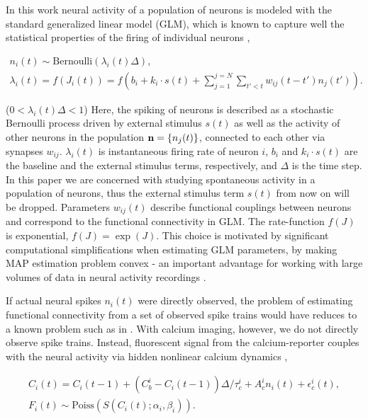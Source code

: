 In this work neural activity of a population of neurons is modeled with the standard generalized linear model (GLM), which is known to capture well the statistical properties of the firing of individual neurons \cite{PILL07, PAN03d, Wu07, Rigat06, OKA05}, 

\begin{equation}\label{eqn:glm:definition}
\begin{array}{l}
n_i(t)\sim \text{Bernoulli}(\lambda_i(t)\Delta), \\
\lambda_i(t)=f(J_i(t))=f(b_i+k_i\cdot s(t)+\sum\limits_{j=1}^{j=N} \sum\limits_{t'<t} w_{ij}(t-t')n_{j}(t')).
\end{array}
\end{equation}

($ 0 < \lambda_i(t)\Delta<1$)
Here, the spiking of neurons is described as a stochastic Bernoulli process driven by external stimulus $s(t)$ as well as the activity of other neurons in the population ${\bf n}=\{n_{j}(t)\}$, connected to each other via synapses $w_{ij}$.  $\lambda_i(t)$ is instantaneous firing rate of neuron $i$, $b_i$ and $k_i\cdot s(t)$ are the baseline and the external stimulus terms, respectively, and $\Delta$ is the time step.  In this paper we are concerned with studying spontaneous activity in a population of neurons, thus the external stimulus term $s(t)$ from now on will be dropped.  Parameters $w_{ij}(t)$ describe functional couplings between neurons and correspond to the functional connectivity in GLM.  The rate-function $f(J)$ is exponential, $f(J)=\exp(J)$.  This choice is motivated by significant computational simplifications when estimating GLM parameters, by making MAP estimation problem convex - an important advantage for working with large volumes of data
in neural activity recordings \cite{PAN03d}.

If actual neural spikes $n_i(t)$ were directly observed, the problem of estimating functional connectivity from a set of observed spike trains would have reduces to a known problem such as in \cite{PILL07}. With calcium imaging, however, we do not directly observe spike trains. Instead, fluorescent signal from the calcium-reporter couples with the neural activity via hidden nonlinear calcium dynamics \cite{Vogelstein2009}, 

\begin{equation}\label{eqn:ca:definition}
\begin{array}{l}
C_i(t) = C_i(t-1) + (C^i_b-C_i(t-1)) \Delta/\tau^i_c + A^i_c n_i(t)+\epsilon_c^i(t), \\
F_i(t) \sim \text{Poiss}( S(C_i(t);\alpha_i, \beta_i) ).
\end{array}
\end{equation}

